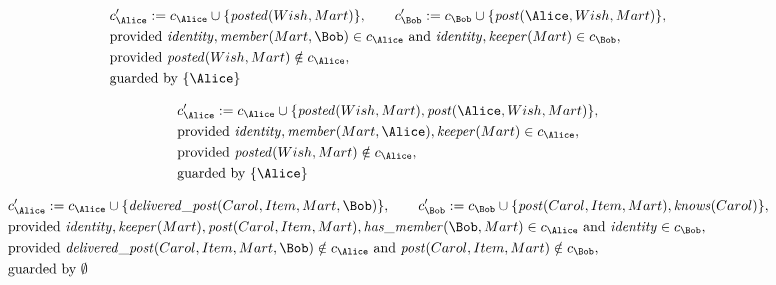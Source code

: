 \begin{align*}
&
c'_
{
\Alice
}
 := 
c_
{
\Alice
}
 \cup 
\{
\mathit{\detokenize{
posted
}}
(
Wish
,
Mart
)
\}
, \qquad 
c'_
{
\Bob
}
 := 
c_
{
\Bob
}
 \cup 
\{
\mathit{\detokenize{
post
}}
(
\Alice
,
Wish
,
Mart
)
\}
,\\
&
\text{provided } 
\mathit{\detokenize{
identity
}}
,
\mathit{\detokenize{
member
}}
(
Mart
,
\Bob
)
 \in c_
{
\Alice
}
 \text{ and } 
\mathit{\detokenize{
identity
}}
,
\mathit{\detokenize{
keeper
}}
(
Mart
)
 \in c_
{
\Bob
}
,\\
&
\text{provided } 
\mathit{\detokenize{
posted
}}
(
Wish
,
Mart
)
 \notin c_
{
\Alice
}
,\\
&
\text{guarded by } \{
\Alice
\}
\end{align*}

\begin{align*}
&
c'_
{
\Alice
}
 := 
c_
{
\Alice
}
 \cup 
\{
\mathit{\detokenize{
posted
}}
(
Wish
,
Mart
)
,
\mathit{\detokenize{
post
}}
(
\Alice
,
Wish
,
Mart
)
\}
,\\
&
\text{provided } 
\mathit{\detokenize{
identity
}}
,
\mathit{\detokenize{
member
}}
(
Mart
,
\Alice
)
,
\mathit{\detokenize{
keeper
}}
(
Mart
)
 \in c_
{
\Alice
}
,\\
&
\text{provided } 
\mathit{\detokenize{
posted
}}
(
Wish
,
Mart
)
 \notin c_
{
\Alice
}
,\\
&
\text{guarded by } \{
\Alice
\}
\end{align*}

\begin{align*}
&
c'_
{
\Alice
}
 := 
c_
{
\Alice
}
 \cup 
\{
\mathit{\detokenize{
delivered_post
}}
(
Carol
,
Item
,
Mart
,
\Bob
)
\}
, \qquad 
c'_
{
\Bob
}
 := 
c_
{
\Bob
}
 \cup 
\{
\mathit{\detokenize{
post
}}
(
Carol
,
Item
,
Mart
)
,
\mathit{\detokenize{
knows
}}
(
Carol
)
\}
,\\
&
\text{provided } 
\mathit{\detokenize{
identity
}}
,
\mathit{\detokenize{
keeper
}}
(
Mart
)
,
\mathit{\detokenize{
post
}}
(
Carol
,
Item
,
Mart
)
,
\mathit{\detokenize{
has_member
}}
(
\Bob
,
Mart
)
 \in c_
{
\Alice
}
 \text{ and } 
\mathit{\detokenize{
identity
}}
 \in c_
{
\Bob
}
,\\
&
\text{provided } 
\mathit{\detokenize{
delivered_post
}}
(
Carol
,
Item
,
Mart
,
\Bob
)
 \notin c_
{
\Alice
}
 \text{ and } 
\mathit{\detokenize{
post
}}
(
Carol
,
Item
,
Mart
)
 \notin c_
{
\Bob
}
,\\
&
\text{guarded by } \emptyset
\end{align*}

